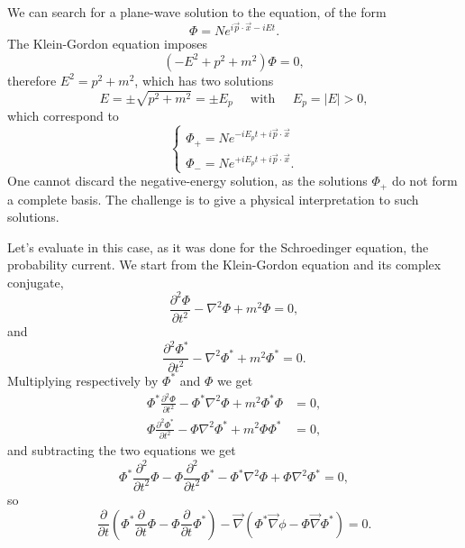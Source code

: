 We can search for a plane-wave solution to the equation, of the form
\begin{equation*}
    \Phi = Ne^{i\Vec{p}\cdot\Vec{x}-iEt}.
\end{equation*}
The Klein-Gordon equation imposes
\begin{equation*}
    (-E^2+p^2+m^2)\Phi = 0,
\end{equation*}
therefore $E^2 = p^2 + m^2$, which has two solutions
\begin{equation*}
    E = \pm\sqrt{p^2+m^2} = \pm E_p \;\;\;\;\;\mbox{with}\;\;\;\;\; E_p=|E| > 0,
\end{equation*}
which correspond to
\begin{equation*}
    \begin{cases} 
    \Phi_+ = Ne^{-iE_pt+i\Vec{p}\cdot\Vec{x}} \\
    \Phi_- = Ne^{+iE_pt+i\Vec{p}\cdot\Vec{x}}.
    \end{cases}
\end{equation*}
One cannot discard the negative-energy solution, as the solutions $\Phi_+$ do not form a complete basis. The challenge is to give a physical interpretation to such solutions.

Let's evaluate  in this case, as it was done for the Schroedinger equation, the probability current. We start from the Klein-Gordon equation and its complex conjugate,
\begin{equation*}
    \frac{\partial^2\Phi}{\partial t^2}-\nabla^2\Phi + m^2\Phi = 0,
\end{equation*}
and
\begin{equation*}
    \frac{\partial^2\Phi^*}{\partial t^2}-\nabla^2\Phi^* + m^2\Phi^* = 0.
\end{equation*}
Multiplying respectively by $\Phi^*$ and $\Phi$ we get
\begin{align*}
    \Phi^*\frac{\partial^2\Phi}{\partial t^2}-\Phi^*\nabla^2\Phi + m^2\Phi^*\Phi &= 0,\\
    \Phi\frac{\partial^2\Phi^*}{\partial t^2}-\Phi\nabla^2\Phi^* + m^2\Phi\Phi^* &= 0,
\end{align*}
and subtracting the two equations we get
\begin{equation*}
    \Phi^*\frac{\partial^2}{\partial t^2}\Phi - \Phi\frac{\partial^2}{\partial t^2}\Phi^* - \Phi^*\nabla^2\Phi + \Phi\nabla^2\Phi^* = 0,
\end{equation*}
so
\begin{equation*}
    \frac{\partial}{\partial t}\left(\Phi^*\frac{\partial}{\partial t}\Phi - \Phi\frac{\partial}{\partial t}\Phi^* \right) - \Vec{\nabla}\left(\Phi^*\Vec{\nabla}\phi - \Phi\Vec{\nabla}\Phi^* \right) = 0.
\end{equation*}

